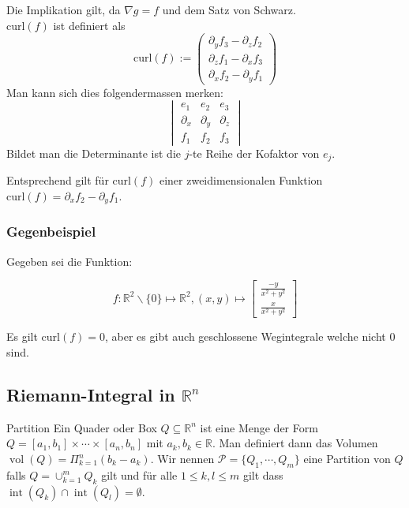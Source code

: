\documentclass[a4paper,10pt]{article}
\def\R{\mathbb{R}}
\DeclareMathOperator{\vol}{\text{vol}}
\DeclareMathOperator{\interior}{\text{int}}
\begin{document}
 Die Implikation gilt, da $\nabla g = f$ und dem Satz von Schwarz.\\
\(\text{curl}(f)\) ist definiert als
\[\text{curl}(f) := \begin{pmatrix}
  \partial_y f_3 - \partial_z f_2 \\
  \partial_z f_1 - \partial_x f_3 \\
  \partial_x f_2 - \partial_y f_1
\end{pmatrix}\]
Man kann sich dies folgendermassen merken:\\
$$\begin{vmatrix}
  e_1 & e_2 & e_3\\
  \partial_x & \partial_y & \partial_z\\
  f_1 & f_2 & f_3
\end{vmatrix}$$
Bildet man die Determinante ist die $j$-te Reihe der Kofaktor von $e_j$.

Entsprechend gilt für $\text{curl}(f)$ einer zweidimensionalen Funktion $\text{curl}(f) = \partial_x f_2 - \partial_y f_1$.

\subsubsection*{Gegenbeispiel}

Gegeben sei die Funktion:

$$f: \R^2 \backslash \{0\} \mapsto \R^2, (x, y) \mapsto \begin{bmatrix}
  \frac{-y}{x^2+y^2}\\
  \frac{x}{x^2+y^2}
\end{bmatrix}$$

Es gilt $\text{curl}(f) = 0$, aber es gibt auch geschlossene Wegintegrale welche nicht $0$ sind.

\subsection{Riemann-Integral in \texorpdfstring{\(\R^n\)}{R^n}}
\begin{subbox}{Partition}
  Ein Quader oder Box $Q \subseteq \R^n$ ist eine Menge der Form  $Q = [a_1, b_1] \times \cdots \times [a_n, b_n]$ mit $a_k, b_k \in \R$. Man definiert dann das Volumen $\vol(Q) = \Pi_{k=1}^n (b_k - a_k)$. Wir nennen $\mathcal{P} = \{ Q_1, \cdots, Q_m \}$ eine Partition von $Q$ falls $Q = \cup_{k=1}^m Q_k$ gilt und für alle $1 \leq k, l \leq m$ gilt dass $\interior(Q_k) \cap \interior(Q_l) = \emptyset$.
\end{subbox}
\end{document}

